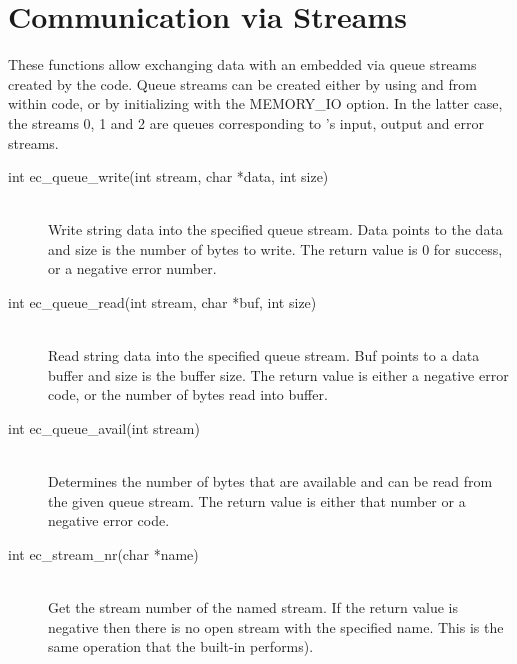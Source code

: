 \section{Communication via {\eclipse} Streams}
These functions allow exchanging data with an embedded {\eclipse} via
queue streams created by the {\eclipse} code.
Queue streams can be created either by using
 and
from within
{\eclipse} code, or by initializing {\eclipse} with the MEMORY_IO option.
In the latter case, the streams 0, 1 and 2 are queues corresponding
to {\eclipse}'s input, output and error streams.
\begin{description}
\item[int		ec_queue_write(int stream, char *data, int size)]\ \\
	Write string data into the specified {\eclipse} queue stream.
	Data points to the data and size is the number of bytes to write.
	The return value is 0 for success, or a negative error number.

\item[int		ec_queue_read(int stream, char *buf, int size)]\ \\
	Read string data into the specified {\eclipse} queue stream.
	Buf points to a data buffer and size is the buffer size.
	The return value is either a negative error code, or the number
	of bytes read into buffer.

\item[int		ec_queue_avail(int stream)]\ \\
	Determines the number of bytes that are available and can be
	read from the given queue stream.  The return value is either
	that number or a negative error code.

\item[int		ec_stream_nr(char *name)]\ \\
	Get the stream number of the named stream. If the return value
	is negative then there is no open stream with the specified name.
        This is the same operation that the {\eclipse} built-in
        performs). 
\end{description}


